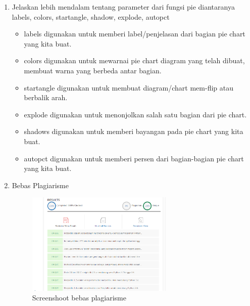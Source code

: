 \begin{enumerate}
\item Jelaskan lebih mendalam tentang parameter dari fungsi pie diantaranya labels,
colors, startangle, shadow, explode, autopct
\begin{itemize}
\item labels digunakan untuk memberi label/penjelasan dari bagian pie chart yang kita buat.
\item colors digunakan untuk mewarnai pie chart diagram yang telah dibuat, membuat warna yang berbeda antar bagian.
\item startangle digunakan untuk membuat diagram/chart mem-flip atau berbalik arah.
\item explode digunakan untuk menonjolkan salah satu bagian dari pie chart.
\item shadows digunakan untuk memberi bayangan pada pie chart yang kita buat.
\item autopct digunakan untuk memberi persen dari bagian-bagian pie chart yang kita buat.
\end{itemize}

\item Bebas Plagiarisme
\begin{figure}[H]
\centering
\includegraphics[width=7cm]{figures/6/1174050/Teori/plagiarism.png}
\caption{Screenshoot bebas plagiarisme}
\end{figure}

\end{enumerate}



